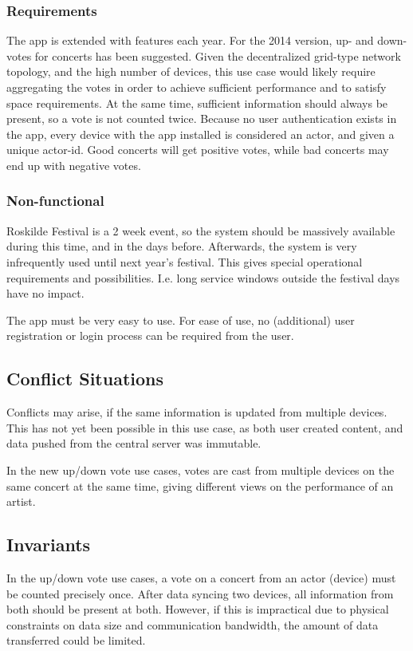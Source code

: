 \documentclass[11pt,a4paper]{report}
\begin{document}
\subsubsection{Requirements}
The app is extended with features each year. For the 2014 version, up- and down-votes for concerts has been suggested. Given the decentralized grid-type network topology, and the high number of devices, this use case would likely require aggregating the votes in order to achieve sufficient performance and to satisfy space requirements.
At the same time, sufficient information should always be present, so a vote is not counted twice. Because no user authentication exists in the app, every device with the app installed is considered an actor, and given a unique actor-id.
Good concerts will get positive votes, while bad concerts may end up with negative votes.

\subsubsection{Non-functional}
Roskilde Festival is a 2 week event, so the system should be massively available during this time, and in the days before. Afterwards, the system is very infrequently used until next year's festival. This gives special operational requirements and possibilities. I.e. long service windows outside the festival days have no impact.

The app must be very easy to use. For ease of use, no (additional) user registration or login process can be required from the user. 

\subsection{Conflict Situations}
Conflicts may arise, if the same information is updated from multiple devices. This has not yet been possible in this use case, as both user created content, and data pushed from the central server was immutable.

In the new up/down vote use cases, votes are cast from multiple devices on the same concert at the same time, giving different views on the performance of an artist.

\subsection{Invariants}
In the up/down vote use cases, a vote on a concert from an actor (device) must be counted precisely once. 
After data syncing two devices, all information from both should be present at both. 
However, if this is impractical due to physical constraints on data size and communication bandwidth, the amount of data transferred  could be limited. 
\end{document}

